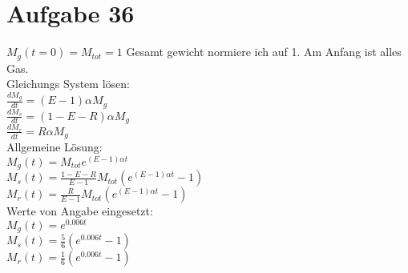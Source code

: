 \section{Aufgabe 36}

$M_g(t=0) = M_{tot} = 1$ Gesamt gewicht normiere ich auf 1. Am Anfang ist alles Gas.\\
Gleichungs System lösen:\\
$\frac{dM_g}{dt} = (E - 1) \alpha M_g$\\
$\frac{dM_s}{dt} = (1 - E - R) \alpha M_g$\\
$\frac{dM_r}{dt} = R \alpha M_g$\\

Allgemeine Lösung:\\
$M_g(t) = M_{tot} e^{(E - 1)\alpha t}$\\
$M_s(t) = \frac{1 - E - R}{E - 1}M_{tot}(e^{(E - 1)\alpha t} - 1)$\\
$M_r(t) = \frac{R}{E -1}M_{tot}(e^{(E - 1)\alpha t} - 1)$\\



Werte von Angabe eingesetzt:\\
$M_g(t) = e^{0.006t}$\\
$M_s(t) = \frac{5}{6}(e^{0.006t} - 1)$\\
$M_r(t) = \frac{1}{6}(e^{0.006t} - 1)$\\
